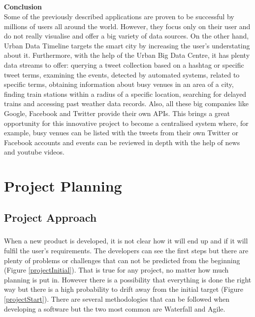 \documentclass{l4proj}
\begin{document}
\paragraph{}
\textbf{Conclusion} \\
Some of the previously described applications are proven to be successful by millions of users all around the world. However, they focus only on their user and do not really visualise and offer a big variety of data sources. On the other hand, Urban Data Timeline targets the smart city by increasing the user's understating about it. Furthermore, with the help of the Urban Big Data Centre, it has plenty data streams to offer: querying a tweet collection based on a hashtag or specific tweet terms, examining the events, detected by automated systems, related to specific terms, obtaining information about busy venues in an area of a city, finding train stations within a radius of a specific location, searching for delayed trains and accessing past weather data records. Also, all these big companies like Google, Facebook and Twitter provide their own APIs. This brings a great opportunity for this innovative project to become a centralised system where, for example, busy venues can be listed with the tweets from their own Twitter or Facebook accounts and events can be reviewed in depth with the help of news and youtube videos.


\chapter{Project Planning}

\section{Project Approach}
\paragraph{}
When a new product is developed, it is not clear how it will end up and if it will fulfil the user's requirements. The developers can see the first steps but there are plenty of problems or challenges that can not be predicted from the beginning (Figure \ref{projectInitial}). That is true for any project, no matter how much planning is put in. However there is a possibility that everything is done the right way but there is a high probability to drift away from the initial target (Figure \ref{projectStart}). There are several methodologies that can be followed when developing a software but the two most common are Waterfall and Agile. 
\end{document}
